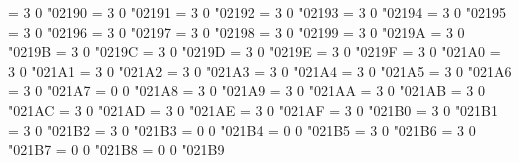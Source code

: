 \Umathchardef\leftarrow = 3 0 "02190 %
\Umathchardef\uparrow = 3 0 "02191 %
\Umathchardef\rightarrow = 3 0 "02192 %
\Umathchardef\downarrow = 3 0 "02193 %
\Umathchardef\leftrightarrow = 3 0 "02194 %
\Umathchardef\updownarrow = 3 0 "02195 %
\Umathchardef\nwarrow = 3 0 "02196 %
\Umathchardef\nearrow = 3 0 "02197 %
\Umathchardef\searrow = 3 0 "02198 %
\Umathchardef\swarrow = 3 0 "02199 %
\Umathchardef\nleftarrow = 3 0 "0219A %
\Umathchardef\nrightarrow = 3 0 "0219B %
\Umathchardef\leftwavearrow = 3 0 "0219C %
\Umathchardef\rightwavearrow = 3 0 "0219D %
\Umathchardef\twoheadleftarrow = 3 0 "0219E %
\Umathchardef\twoheaduparrow = 3 0 "0219F %
\Umathchardef\twoheadrightarrow = 3 0 "021A0 %
\Umathchardef\twoheaddownarrow = 3 0 "021A1 %
\Umathchardef\leftarrowtail = 3 0 "021A2 %
\Umathchardef\rightarrowtail = 3 0 "021A3 %
\Umathchardef\mapsfrom = 3 0 "021A4 %
\Umathchardef\mapsup = 3 0 "021A5 %
\Umathchardef\mapsto = 3 0 "021A6 %
\Umathchardef\mapsdown = 3 0 "021A7 %
\Umathchardef\updownarrowbar = 0 0 "021A8 %
\Umathchardef\hookleftarrow = 3 0 "021A9 %
\Umathchardef\hookrightarrow = 3 0 "021AA %
\Umathchardef\looparrowleft = 3 0 "021AB %
\Umathchardef\looparrowright = 3 0 "021AC %
\Umathchardef\leftrightsquigarrow = 3 0 "021AD %
\Umathchardef\nleftrightarrow = 3 0 "021AE %
\Umathchardef\downzigzagarrow = 3 0 "021AF %
\Umathchardef\Lsh = 3 0 "021B0 %
\Umathchardef\Rsh = 3 0 "021B1 %
\Umathchardef\Ldsh = 3 0 "021B2 %
\Umathchardef\Rdsh = 3 0 "021B3 %
\Umathchardef\linefeed = 0 0 "021B4 %
\Umathchardef\carriagereturn = 0 0 "021B5 %
\Umathchardef\curvearrowleft = 3 0 "021B6 %
\Umathchardef\curvearrowright = 3 0 "021B7 %
\Umathchardef\barovernorthwestarrow = 0 0 "021B8 %
\Umathchardef\barleftarrowrightarrowbar = 0 0 "021B9 %
